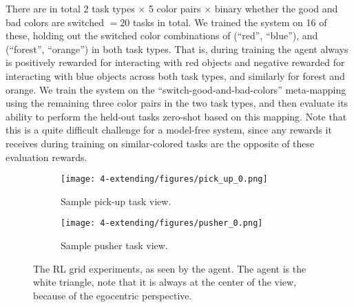 There are in total 2 task types \(\times\) 5 color pairs \(\times\) binary whether the good and bad colors are switched \(= 20\) tasks in total. We trained the system on 16 of these, holding out the switched color combinations of (``red'', ``blue''), and (``forest'', ``orange'') in both task types. That is, during training the agent always is positively rewarded for interacting with red objects and negative rewarded for interacting with blue objects across both task types, and similarly for forest and orange. We train the system on the ``switch-good-and-bad-colors'' meta-mapping using the remaining three color pairs in the two task types, and then evaluate its ability to perform the held-out tasks zero-shot based on this mapping. Note that this is a quite difficult challenge for a model-free system, since any rewards it receives during training on similar-colored tasks are the opposite of these evaluation rewards.\par
\begin{figure}
\centering
\begin{subfigure}[b]{0.5\textwidth}
\centering
\texttt{[image: 4-extending/figures/pick\_up\_0.png]}
\caption{Sample pick-up task view.}
\end{subfigure}%
\begin{subfigure}[b]{0.5\textwidth}
\centering
\texttt{[image: 4-extending/figures/pusher\_0.png]}
\caption{Sample pusher task view.} 
\end{subfigure}%
\caption{The RL grid experiments, as seen by the agent. The agent is the white triangle, note that it is always at the center of the view, because of the egocentric perspective.} \label{fig:extending_grid_task_views}
\end{figure}

